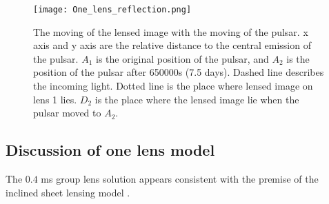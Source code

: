 \documentclass[useAMS,usenatbib]{mn2e}
\begin{document}


\begin{figure}
\centering
\texttt{[image: One\_lens\_reflection.png]}
\caption{The moving of the lensed image with the moving of the pulsar. x axis and y axis are the relative distance to the central emission of the pulsar. $A_1$ is the original position of the pulsar, and $A_2$ is the position of the pulsar after 650000s (7.5 days). Dashed line describes the incoming light. Dotted line is the place where lensed image on lens 1 lies. $D_2$ is the place where the lensed image lie when the pulsar moved to $A_2$.}
\label{OneLensReflect}
\end{figure}



\subsection{Discussion of one lens model}

The $0.4$ ms group lens solution appears consistent with the premise of the inclined
sheet lensing model \citep{2014MNRAS.442.3338P}.
\end{document}
